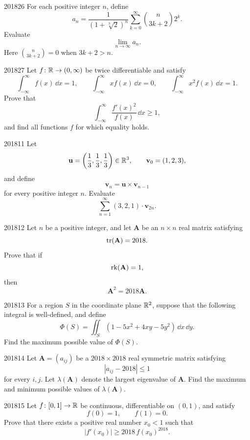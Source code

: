 \begin{problem}{2018}{2}{6}
For each positive integer $n$, define
\[
    a_n
    =\frac{1}{(1+\sqrt[3]{2})^n}
    \sum_{k=0}^{\infty}\binom{n}{3k+2}2^k.
\]
Evaluate
\[
    \lim_{n\to\infty}a_n.
\]
Here $\binom{n}{3k+2}=0$ when $3k+2>n$.
\end{problem}

\begin{problem}{2018}{2}{7}
Let $f\colon\mathbb{R}\to(0, \infty)$ be twice differentiable and satisfy
\[
    \int_{-\infty}^{\infty}f(x)\, \dd x=1,
    \qquad
    \int_{-\infty}^{\infty}xf(x)\, \dd x=0,
    \qquad
    \int_{-\infty}^{\infty}x^2f(x)\, \dd x=1.
\]
Prove that
\[
    \int_{-\infty}^{\infty}\frac{f'(x)^2}{f(x)}\, \dd x\ge1,
\]
and find all functions $f$ for which equality holds.
\end{problem}

\begin{problem}{2018}{1}{1}
Let
\[
    \mathbf u=\left(\frac13, \frac13, \frac13\right)\in\mathbb{R}^3,
    \qquad
    \mathbf v_0=(1, 2, 3),
\]
and define
\[
    \mathbf v_n=\mathbf u\times\mathbf v_{n-1}
\]
for every positive integer $n$. Evaluate
\[
    \sum_{n=1}^{\infty}(3, 2, 1)\cdot\mathbf v_{2n}.
\]
\end{problem}

\begin{problem}{2018}{1}{2}
Let $n$ be a positive integer, and let $\mathbf A$ be an $n\times n$ real matrix satisfying
\[
    \operatorname{tr}(\mathbf A)=2018.
\]
Prove that if
\[
    \operatorname{rk}(\mathbf A)=1,
\]
then
\[
    \mathbf A^2=2018\mathbf A.
\]
\end{problem}

\begin{problem}{2018}{1}{3}
For a region $S$ in the coordinate plane $\mathbb{R}^2$, suppose that the following integral is well-defined, and define
\[
    \Phi(S)
    =\iint_S(1-5x^2+4xy-5y^2)\, \dd x\, \dd y.
\]
Find the maximum possible value of $\Phi(S)$.
\end{problem}

\begin{problem}{2018}{1}{4}
Let $\mathbf A=(a_{ij})$ be a $2018\times2018$ real symmetric matrix satisfying
\[
    |a_{ij}-2018|\le1
\]
for every $i, j$. Let $\lambda(\mathbf A)$ denote the largest eigenvalue of $\mathbf A$. Find the maximum and minimum possible values of $\lambda(\mathbf A)$.
\end{problem}

\begin{problem}{2018}{1}{5}
Let $f\colon[0, 1]\to\mathbb{R}$ be continuous, differentiable on $(0, 1)$, and satisfy
\[
    f(0)=1,
    \qquad
    f(1)=0.
\]
Prove that there exists a positive real number $x_0<1$ such that
\[
    |f'(x_0)|\ge2018\, f(x_0)^{2018}.
\]
\end{problem}

